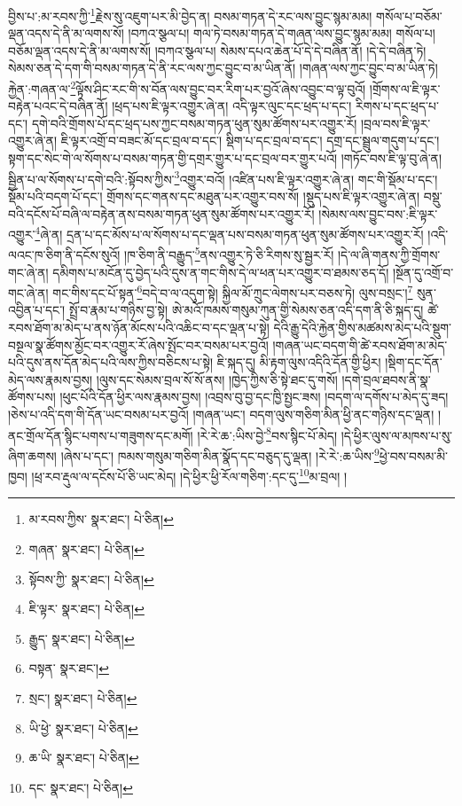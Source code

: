 བྱིས་པ་:མ་རབས་ཀྱི་\footnote{མ་རབས་ཀྱིས་  སྣར་ཐང་།  པེ་ཅིན། }རྗེས་སུ་འཇུག་པར་མི་བྱེད་ན། བསམ་གཏན་དེ་རང་ལས་བྱུང་སྙམ་མམ། གསོལ་པ་བཅོམ་ལྡན་འདས་དེ་ནི་མ་ལགས་སོ། །བཀའ་སྩལ་པ། གལ་ཏེ་བསམ་གཏན་དེ་གཞན་ལས་བྱུང་སྙམ་མམ། གསོལ་པ། བཅོམ་ལྡན་འདས་དེ་ནི་མ་ལགས་སོ། །བཀའ་སྩལ་པ། སེམས་དཔའ་ཆེན་པོ་དེ་དེ་བཞིན་ནོ། །དེ་དེ་བཞིན་ཏེ། སེམས་ཅན་དེ་དག་གི་བསམ་གཏན་དེ་ནི་རང་ལས་ཀྱང་བྱུང་བ་མ་ཡིན་ནོ། །གཞན་ལས་ཀྱང་བྱུང་བ་མ་ཡིན་ཏེ། རྐྱེན་:གཞན་ལ་\footnote{གཞན་  སྣར་ཐང་།  པེ་ཅིན། }ལྟོས་ཤིང་རང་གི་ས་བོན་ལས་བྱུང་བར་རིག་པར་བྱའོ་ཞེས་འབྱུང་བ་ལྟ་བུའོ། །གྲོགས་ལ་ཇི་ལྟར་བརྟེན་པའང་དེ་བཞིན་ནོ། །ཕྲད་པས་ཇི་ལྟར་འགྱུར་ཞེ་ན། འདི་ལྟར་ལུང་དང་ཕྲད་པ་དང་། རིགས་པ་དང་ཕྲད་པ་དང་། དགེ་བའི་གྲོགས་པོ་དང་ཕྲད་པས་ཀྱང་བསམ་གཏན་ཕུན་སུམ་ཚོགས་པར་འགྱུར་རོ། །བྲལ་བས་ཇི་ལྟར་འགྱུར་ཞེ་ན། ཇི་ལྟར་འགྲོ་བ་བཟང་མོ་དང་བྲལ་བ་དང་། སྡིག་པ་དང་བྲལ་བ་དང་། དགྲ་དང་སྦྲུལ་གདུག་པ་དང་། སྟག་དང་སེང་གེ་ལ་སོགས་པ་བསམ་གཏན་གྱི་དགྲར་གྱུར་པ་དང་བྲལ་བར་གྱུར་པའོ། །གཏོང་བས་ཇི་ལྟ་བུ་ཞེ་ན། སྦྱིན་པ་ལ་སོགས་པ་དགེ་བའི་:སྟོབས་ཀྱིས་\footnote{སྟོབས་ཀྱི་  སྣར་ཐང་།  པེ་ཅིན། }འགྱུར་བའོ། །འཛིན་པས་ཇི་ལྟར་འགྱུར་ཞེ་ན། གང་གི་སྡོམ་པ་དང་། སྡོམ་པའི་བདག་པོ་དང་། གྲོགས་དང་གནས་དང་མཐུན་པར་འགྱུར་བས་སོ། །སྡུད་པས་ཇི་ལྟར་འགྱུར་ཞེ་ན། བསྡུ་བའི་དངོས་པོ་བཞི་ལ་བརྟེན་ནས་བསམ་གཏན་ཕུན་སུམ་ཚོགས་པར་འགྱུར་རོ། །སེམས་ལས་བྱུང་བས་:ཇི་ལྟར་འགྱུར་\footnote{ཇི་ལྟར་  སྣར་ཐང་།  པེ་ཅིན། }ཞེ་ན། དྲན་པ་དང་མོས་པ་ལ་སོགས་པ་དང་ལྡན་པས་བསམ་གཏན་ཕུན་སུམ་ཚོགས་པར་འགྱུར་རོ། །འདི་ལའང་ཁ་ཅིག་ནི་དངོས་སུའོ། །ཁ་ཅིག་ནི་བརྒྱུད་\footnote{རྒྱུད་  སྣར་ཐང་།  པེ་ཅིན། }ནས་འགྱུར་ཏེ་ཅི་རིགས་སུ་སྦྱར་རོ། །དེ་ལ་ཞི་གནས་ཀྱི་གྲོགས་གང་ཞེ་ན། དམིགས་པ་མངོན་དུ་བྱེད་པའི་དུས་ན་གང་གིས་དེ་ལ་ཕན་པར་འགྱུར་བ་ཐམས་ཅད་དོ། །སྔོན་དུ་འགྲོ་བ་གང་ཞེ་ན། གང་གིས་དང་པོ་སྟན་\footnote{བསྟན་  སྣར་ཐང་། }བདེ་བ་ལ་འདུག་སྟེ། སྐྱིལ་མོ་ཀྲུང་ལེགས་པར་བཅས་ཏེ། ལུས་བསྲང་།\footnote{སྲང་།  སྣར་ཐང་།  པེ་ཅིན། } སུན་འབྱིན་པ་དང་། སྤྲོ་བ་རྣམ་པ་གཉིས་བྱ་སྟེ། ཨེ་མའོ་ཁམས་གསུམ་ཀུན་གྱི་སེམས་ཅན་འདི་དག་ནི་ཅི་སྐད་དུ། ཚེ་རབས་ཐོག་མ་མེད་པ་ནས་ཉོན་མོངས་པའི་འཆིང་བ་དང་ལྡན་པ་སྟེ། དེའི་རྒྱུ་དེའི་རྐྱེན་གྱིས་མཚམས་མེད་པའི་སྡུག་བསྔལ་སྣ་ཚོགས་མྱོང་བར་འགྱུར་རོ་ཞེས་སྤོང་བར་བསམ་པར་བྱའོ། །གཞན་ཡང་བདག་གི་ཚེ་རབས་ཐོག་མ་མེད་པའི་དུས་ནས་དོན་མེད་པའི་ལས་ཀྱིས་བཅིངས་པ་སྟེ། ཇི་སྐད་དུ། མི་རྟག་ལུས་འདིའི་དོན་གྱི་ཕྱིར། །སྡིག་དང་དོན་མེད་ལས་རྣམས་བྱས། །ལུས་དང་སེམས་བྲལ་སོ་སོ་ནས། །ཁྱེད་ཀྱིས་ཅི་སྟེ་ཐང་དུ་གསོ། །དགེ་བྲལ་ཐབས་ནི་སྣ་ཚོགས་པས། །ཕུང་པོའི་དོན་ཕྱིར་ལས་རྣམས་བྱས། །འབྲས་བུ་བྱ་དང་ཁྱི་སྤྱང་ཟས། །བདག་ལ་དགོས་པ་མེད་དུ་ཟད། །ཅེས་པ་འདི་དག་གི་དོན་ཡང་བསམ་པར་བྱའོ། །གཞན་ཡང་། བདག་ལུས་གཅིག་མིན་ཕྱི་ནང་གཉིས་དང་ལྡན། །ནང་གྲོལ་དོན་སྙིང་པགས་པ་གཟུགས་དང་མགོ། །རེ་རེ་ཆ་:ཡིས་བྱེ་\footnote{ཡི་ཕྱེ་  སྣར་ཐང་།  པེ་ཅིན། }བས་སྙིང་པོ་མེད། །དེ་ཕྱིར་ལུས་ལ་མཁས་པ་སུ་ཞིག་ཆགས། །ཞེས་པ་དང་། ཁམས་གསུམ་གཅིག་མིན་སྣོད་དང་བཅུད་དུ་ལྡན། །རེ་རེ་:ཆ་ཡིས་\footnote{ཆ་ཡི་  སྣར་ཐང་།  པེ་ཅིན། }ཕྱེ་བས་བསམ་མི་ཁྱབ། །ཕྲ་རབ་རྡུལ་ལ་དངོས་པོ་ཅི་ཡང་མེད། །དེ་ཕྱིར་ཕྱི་རོལ་གཅིག་:དང་དུ་\footnote{དང་  སྣར་ཐང་།  པེ་ཅིན། }མ་བྲལ། །
